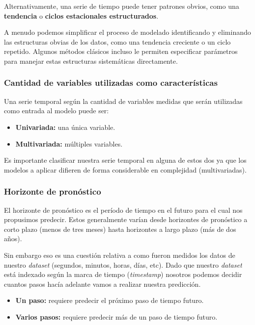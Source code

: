 \documentclass[a4paper,12pt]{article}
\begin{document}
Alternativamente, una serie de tiempo puede tener patrones obvios, como una \textbf{tendencia} o \textbf{ciclos estacionales estructurados}.

A menudo podemos simplificar el proceso de modelado identificando y eliminando las estructuras obvias de los datos, como una tendencia creciente o un ciclo repetido. Algunos métodos clásicos incluso le permiten especificar parámetros para manejar estas estructuras sistemáticas directamente.

\subsubsection{Cantidad de variables utilizadas como características}

Una serie temporal según la cantidad de variables medidas que serán utilizadas como entrada al modelo puede ser:
\begin{itemize}[noitemsep, topsep=2pt]
	\item \textbf{Univariada:} una única variable.
	\item \textbf{Multivariada:} múltiples variables. 
\end{itemize}

Es importante clasificar nuestra serie temporal en alguna de estos dos ya que los modelos a aplicar difieren de forma considerable en complejidad (multivariadas).

\subsubsection{Horizonte de pronóstico}

El horizonte de pronóstico es el período de tiempo en el futuro para el cual nos propusimos predecir. Estos generalmente varían desde horizontes de pronóstico a corto plazo (menos de tres meses) hasta horizontes a largo plazo (más de dos años).

Sin embargo eso es una cuestión relativa a como fueron medidos los datos de nuestro \textit{dataset} (segundos, minutos, horas, días, etc). Dado que nuestro \textit{dataset} está indexado según la marca de tiempo (\textit{timestamp}) nosotros podemos decidir cuantos pasos hacía adelante vamos a realizar nuestra predicción.

\begin{itemize}[noitemsep, topsep=2pt]
	\item \textbf{Un paso:} requiere predecir el próximo paso de tiempo futuro.
	\item \textbf{Varios pasos:} requiere predecir más de un paso de tiempo futuro.
\end{itemize}
\end{document}
